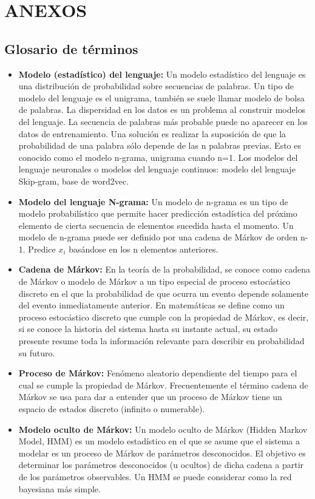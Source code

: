 \documentclass[spanish,12pt, a4paper,twoside]{paper}
\let\oldsection\section
\def\section{\cleardoublepage\oldsection}
\begin{document}
\section{ANEXOS}

\subsection{Glosario de términos}\label{sec:glosariodeterminos}
\begin{itemize}
	\item \textbf{Modelo (estadístico) del lenguaje:} Un modelo estadístico del lenguaje es una distribución de probabilidad sobre secuencias de palabras. Un tipo de modelo del lenguaje es el unigrama, también se suele llamar modelo de bolsa de palabras. La dispersidad en los datos es un problema al construir modelos del lenguaje. La secuencia de palabras más probable puede no aparecer en los datos de entrenamiento. Una solución es realizar la suposición de que la probabilidad de una palabra sólo depende de las n palabras previas. Esto es conocido como el modelo n-grama, unigrama cuando n=1. Los modelos del lenguaje neuronales o modelos del lenguaje continuos: modelo del lenguaje Skip-gram, base de word2vec.
	\item \textbf{Modelo del lenguaje N-grama:} Un modelo de n-grama es un tipo de modelo probabilístico que permite hacer predicción estadística del próximo elemento de cierta secuencia de elementos sucedida hasta el momento. Un modelo de n-grama puede ser definido por una cadena de Márkov de orden n-1. Predice $x_i$ basándose en los n elementos anteriores. 
	\item \textbf{Cadena de Márkov:} En la teoría de la probabilidad, se conoce como cadena de Márkov o modelo de Márkov a un tipo especial de proceso estocástico discreto en el que la probabilidad de que ocurra un evento depende solamente del evento inmediatamente anterior. En matemáticas se define como un proceso estocástico discreto que cumple con la propiedad de Márkov, es decir, si se conoce la historia del sistema hasta su instante actual, su estado presente resume toda la información relevante para describir en probabilidad su futuro.
	\item \textbf{Proceso de Márkov:} Fenómeno aleatorio dependiente del tiempo para el cual se cumple la propiedad de Márkov. Frecuentemente el término cadena de Márkov se usa para dar a entender que un proceso de Márkov tiene un espacio de estados discreto (infinito o numerable).
	\item \textbf{Modelo oculto de Márkov:} Un modelo oculto de Márkov (Hidden Markov Model, HMM) es un modelo estadístico en el que se asume que el sistema a modelar es un proceso de Márkov de parámetros desconocidos. El objetivo es determinar los parámetros desconocidos (u ocultos) de dicha cadena a partir de los parámetros observables. Un HMM se puede considerar como la red bayesiana más simple. 

\end{itemize}
\end{document}
